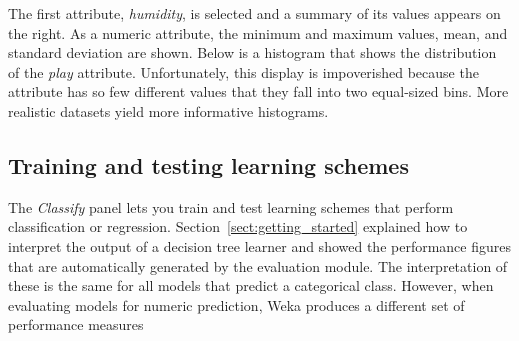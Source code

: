 The first attribute, \textit{humidity}, is selected and a summary of
its values appears on the right. As a numeric attribute, the minimum
and maximum values, mean, and standard deviation are shown. Below is a
histogram that shows the distribution of the \textit{play}
attribute. Unfortunately, this display is impoverished because the
attribute has so few different values that they fall into two
equal-sized bins. More realistic datasets yield more informative
histograms.

\subsection{Training and testing learning schemes}

The \textit{Classify} panel lets you train and test learning schemes
that perform classification or
regression. Section~\ref{sect:getting_started} explained how to
interpret the output of a decision tree learner and showed the
performance figures that are automatically generated by the evaluation
module. The interpretation of these is the same for all models that
predict a categorical class. However, when evaluating models for
numeric prediction, Weka produces a different set of performance
measures

